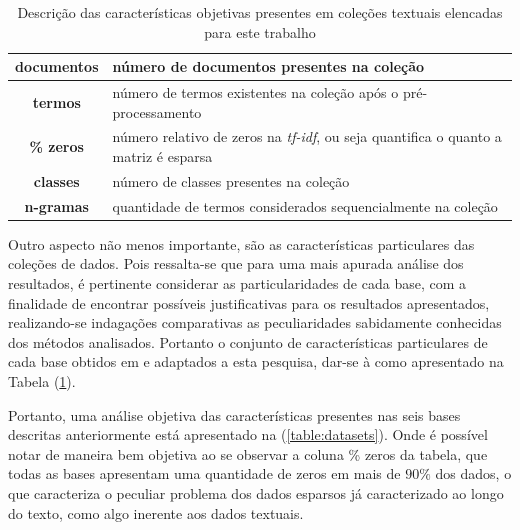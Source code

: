 \begin{table}[!htp]
  \centering
  \begin{tabular}{ |c|p{11cm}|}
    \hline
    {\bf documentos} & número de documentos presentes na coleção \\
    \hline
    {\bf termos} & número de termos existentes na coleção após o pré-processamento \\
    \hline
    {\bf \% zeros} & número relativo de zeros na {\it tf-idf\/}, ou seja quantifica o quanto a
matriz é esparsa \\
    \hline
    {\bf classes} & número de classes presentes na coleção \\
    \hline
    {\bf n-gramas} & quantidade de termos considerados sequencialmente na coleção \\
    \hline
  \end{tabular}
  \caption{Descrição das características objetivas presentes em coleções textuais elencadas para
este trabalho}
  \label{table:datainfo}
\end{table}

Outro aspecto não menos importante, são as características particulares das coleções de dados. Pois
ressalta-se que para uma mais apurada análise dos resultados, é pertinente considerar as
particularidades de cada base, com a finalidade de encontrar possíveis justificativas para os
resultados apresentados, realizando-se indagações comparativas as peculiaridades sabidamente
conhecidas dos métodos analisados. Portanto o conjunto de características particulares de cada base
obtidos em  e adaptados a esta pesquisa, dar-se à como apresentado
na Tabela (\ref{table:datainfo}). 


Portanto, uma análise objetiva das características presentes nas seis bases descritas anteriormente 
está apresentado na (\ref{table:datasets}). Onde é possível notar de maneira bem 
objetiva ao se observar
a coluna \% zeros da tabela, que todas as bases apresentam uma quantidade de zeros em mais de $90\%$
dos dados, o que caracteriza o peculiar problema dos dados esparsos já caracterizado ao longo do
texto, como algo inerente aos dados textuais.


